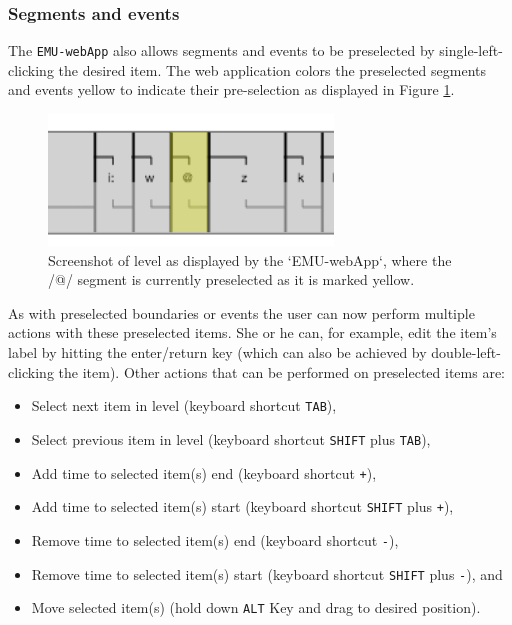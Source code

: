 \documentclass[]{book}
\providecommand{\tightlist}{%
  \setlength{\itemsep}{0pt}\setlength{\parskip}{0pt}}
\begin{document}
\hypertarget{segments-events}{%
\subsubsection{Segments and events}\label{segments-events}}

The \texttt{EMU-webApp} also allows segments and events to be preselected by single-left-clicking the desired item. The web application colors the preselected segments and events yellow to indicate their pre-selection as displayed in Figure \ref{fig:webApp-preSelSeg}.

\begin{figure}

{\centering \includegraphics[width=0.4\linewidth]{pics/preSelSeg} 

}

\caption{Screenshot of level as displayed by the `EMU-webApp`, where the /@/ segment is currently preselected as it is marked yellow.}\label{fig:webApp-preSelSeg}
\end{figure}

As with preselected boundaries or events the user can now perform multiple actions with these preselected items. She or he can, for example, edit the item's label by hitting the enter/return key (which can also be achieved by double-left-clicking the item). Other actions that can be performed on preselected items are:

\begin{itemize}
\tightlist
\item
  Select next item in level (keyboard shortcut \texttt{TAB}),
\item
  Select previous item in level (keyboard shortcut \texttt{SHIFT} plus \texttt{TAB}),
\item
  Add time to selected item(s) end (keyboard shortcut \texttt{+}),
\item
  Add time to selected item(s) start (keyboard shortcut \texttt{SHIFT} plus \texttt{+}),
\item
  Remove time to selected item(s) end (keyboard shortcut \texttt{-}),
\item
  Remove time to selected item(s) start (keyboard shortcut \texttt{SHIFT} plus \texttt{-}), and
\item
  Move selected item(s) (hold down \texttt{ALT} Key and drag to desired position).
\end{itemize}
\end{document}
